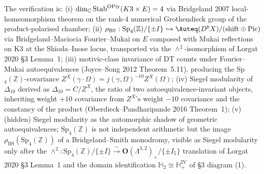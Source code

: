 \begin{remark}
The verification is:
\textup{(i)} $\dim_{\mathbb C}\mathrm{Stab}^{\mathrm{OPiy}}(K3\times E)=4$ via
Bridgeland 2007 local-homeomorphism theorem on the rank-$4$
numerical Grothendieck group of the product-polarised chamber;
\textup{(ii)} $\rho_{\mathrm{BS}}:\mathrm{Sp}_4(\mathbb Z)/\{\pm I\}
\hookrightarrow\Auteq(D^b X)/(\mathrm{shift}\oplus\mathrm{Pic})$ via
Bridgeland--Maciocia Fourier--Mukai on $E$ composed with Mukai
reflections on K3 at the Shioda--Inose locus, transported via the
$\wedge^2$-isomorphism of Lorgat 2020 \S 3 Lemma~1;
\textup{(iii)} motivic-class invariance of DT counts under
Fourier--Mukai autoequivalences (Joyce--Song 2012 Theorem~5.11),
producing the Sp$_4(\mathbb Z)$-covariance
$Z^X(\gamma\cdot\Omega)=j(\gamma,\Omega)^{-10}Z^X(\Omega)$;
\textup{(iv)} Siegel modularity of $\Delta_{10}$ derived as
$\Delta_{10}=C/Z^X$, the ratio of two autoequivalence-invariant
objects, inheriting weight $+10$ covariance from $Z^X$'s weight
$-10$ covariance and the constancy of the product
(Oberdieck--Pandharipande 2016 Theorem~1);
\textup{(v)} (hidden) Siegel modularity as the automorphic shadow of
geometric autoequivalences; $\mathrm{Sp}_4(\mathbb Z)$ is not
independent arithmetic but the image
$\rho_{\mathrm{BS}}(\mathrm{Sp}_4(\mathbb Z))$ of a Bridgeland--Smith
monodromy, visible as Siegel modularity only after the
$\wedge^2:\mathrm{Sp}_4(\mathbb Z)/\{\pm I\}
\xrightarrow{\sim}\mathbf O(\Lambda^{3,2})_+/\{\pm I_5\}$ translation
of Lorgat 2020 \S 3 Lemma~1 and the domain identification
$\mathbb H_2\cong\mathbb H_+^{\mathrm{IV}}$ of \S 3 diagram (1).
\end{remark}

